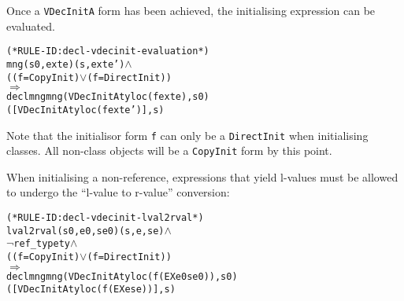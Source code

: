 \documentclass[11pt]{article}
\begin{document}
Once a \texttt{VDecInitA} form has been achieved, the initialising
expression can be evaluated.
\begin{center}
\begin{minipage}{\textwidth}
%
\begin{alltt}
(* RULE-ID: decl-vdecinit-evaluation *)
     mng (s0, exte) (s, exte') \(\land\)
     ((f = CopyInit) \(\lor\) (f = DirectInit))
   \(\Rightarrow\)
     declmng mng (VDecInitA ty loc (f exte), s0)
                 ([VDecInitA ty loc (f exte')], s)
\end{alltt}
\end{minipage}
\end{center}
Note that the initialisor form \texttt{f} can only be a
\texttt{DirectInit} when initialising classes.  All non-class objects
will be a \texttt{CopyInit} form by this point.

When initialising a non-reference, expressions that yield l-values
must be allowed to undergo the ``l-value to r-value'' conversion:
\begin{center}
\begin{minipage}{\textwidth}
%
\begin{alltt}
(* RULE-ID: decl-vdecinit-lval2rval *)
     lval2rval (s0,e0,se0) (s,e,se) \(\land\)
     \(\neg\)ref_type ty \(\land\)
     ((f = CopyInit) \(\lor\) (f = DirectInit))
   \(\Rightarrow\)
     declmng mng (VDecInitA ty loc (f (EX e0 se0)), s0)
                 ([VDecInitA ty loc (f (EX e se))], s)
\end{alltt}
\end{minipage}
\end{center}
\end{document}
